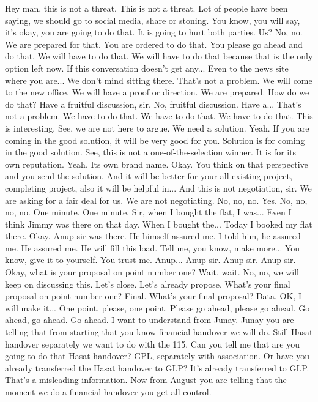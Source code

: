 Hey man, this is not a threat.
This is not a threat.
Lot of people have been saying,
we should go to social media, share or stoning.
You know, you will say, it's okay, you are going to do that.
It is going to hurt both parties.
Us?
No, no.
We are prepared for that.
You are ordered to do that.
You please go ahead and do that.
We will have to do that.
We will have to do that because that is the only option left now.
If this conversation doesn't get any...
Even to the news site where you are...
We don't mind sitting there.
That's not a problem.
We will come to the new office.
We will have a proof or direction.
We are prepared.
How do we do that?
Have a fruitful discussion, sir.
No, fruitful discussion.
Have a...
That's not a problem.
We have to do that.
We have to do that.
We have to do that.
This is interesting.
See, we are not here to argue.
We need a solution.
Yeah.
If you are coming in the good solution,
it will be very good for you.
Solution is for coming in the good solution.
See, this is not a one-of-the-selection winner.
It is for its own reputation.
Yeah.
Its own brand name.
Okay.
You think on that perspective and you send the solution.
And it will be better for your all-existing project,
completing project, also it will be helpful in...
And this is not negotiation, sir.
We are asking for a fair deal for us.
We are not negotiating.
No, no, no.
Yes.
No, no, no, no.
One minute.
One minute.
Sir, when I bought the flat,
I was...
Even I think Jimmy was there on that day.
When I bought the...
Today I booked my flat there.
Okay.
Anup sir was there.
He himself assured me.
I told him,
he assured me.
He assured me.
He will fill this load.
Tell me, you know,
make more...
You know,
give it to yourself.
You trust me.
Anup...
Anup sir.
Anup sir.
Anup sir.
Okay,
what is your proposal
on point number one?
Wait, wait.
No, no, we will keep on discussing this.
Let's close.
Let's already propose.
What's your final proposal
on point number one?
Final.
What's your final proposal?
Data.
OK,
I will make it...
One point, please,
one point.
Please go ahead, please go ahead.
Go ahead, go ahead.
Go ahead.
I want to understand from Junay. Junay you are telling that from starting that you know financial handover we will do.
Still Hasat handover separately we want to do with the 115.
Can you tell me that are you going to do that Hasat handover? GPL, separately with association.
Or have you already transferred the Hasat handover to GLP?
It's already transferred to GLP.
That's a misleading information.
Now from August you are telling that the moment we do a financial handover you get all control.
